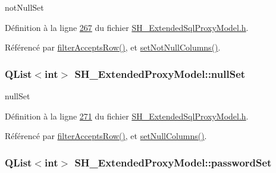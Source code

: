 not\-Null\-Set 



Définition à la ligne \hyperlink{SH__ExtendedSqlProxyModel_8h_source_l00267}{267} du fichier \hyperlink{SH__ExtendedSqlProxyModel_8h_source}{S\-H\-\_\-\-Extended\-Sql\-Proxy\-Model.\-h}.



Référencé par \hyperlink{classSH__ExtendedProxyModel_a5c9a68f10afb83af24896beac56e0ae3}{filter\-Accepts\-Row()}, et \hyperlink{classSH__ExtendedProxyModel_aa198a2c1f4bfaae18d9e9dd8dce7e5cc}{set\-Not\-Null\-Columns()}.

\hypertarget{classSH__ExtendedProxyModel_a0a3818c6f8e4b73d1b5b47b2914cb56d}{
\subsubsection[{null\-Set}]{\setlength{\rightskip}{0pt plus 5cm}Q\-List$<$int$>$ S\-H\-\_\-\-Extended\-Proxy\-Model\-::null\-Set\hspace{0.3cm}{\ttfamily [private]}}}\label{classSH__ExtendedProxyModel_a0a3818c6f8e4b73d1b5b47b2914cb56d}


null\-Set 



Définition à la ligne \hyperlink{SH__ExtendedSqlProxyModel_8h_source_l00271}{271} du fichier \hyperlink{SH__ExtendedSqlProxyModel_8h_source}{S\-H\-\_\-\-Extended\-Sql\-Proxy\-Model.\-h}.



Référencé par \hyperlink{classSH__ExtendedProxyModel_a5c9a68f10afb83af24896beac56e0ae3}{filter\-Accepts\-Row()}, et \hyperlink{classSH__ExtendedProxyModel_acf3e473b4ed806f9daf0ad6e32f0c3af}{set\-Null\-Columns()}.

\hypertarget{classSH__ExtendedProxyModel_a9616e7be442b560e260e1db9034143bc}{
\subsubsection[{password\-Set}]{\setlength{\rightskip}{0pt plus 5cm}Q\-List$<$int$>$ S\-H\-\_\-\-Extended\-Proxy\-Model\-::password\-Set\hspace{0.3cm}{\ttfamily [private]}}}\label{classSH__ExtendedProxyModel_a9616e7be442b560e260e1db9034143bc}


